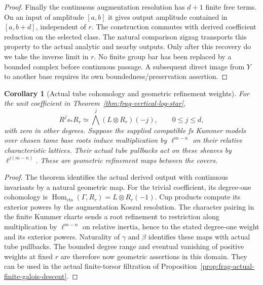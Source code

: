 \documentclass[11pt]{article}
\newtheorem{corollary}[theorem]{Corollary}
\theoremstyle{definition}
\theoremstyle{remark}
\begin{document}
\begin{proof}
Finally the continuous augmentation resolution has $d+1$ finite free
terms.  On an input of amplitude $[a,b]$ it gives output amplitude
contained in $[a,b+d]$, independent of $r$.  The construction commutes
with derived coefficient reduction on the selected class.  The natural
comparison zigzag transports this property to the actual analytic and
nearby outputs.  Only after this recovery do we take the inverse limit
in $r$.  No finite group bar has been replaced by a bounded complex
before continuous passage.  A subsequent direct image from $Y$ to another
base requires its own boundedness/preservation assertion.
\end{proof}

\begin{corollary}[Actual tube cohomology and geometric refinement weights]
\label{cor:frag-log-tube-root-weights}
For the unit coefficient in Theorem~\ref{thm:frag-vertical-log-star},
\[
 R^j s_*R_r\simeq\bigwedge^j(L\otimes R_r)(-j),\qquad 0\le j\le d,
\]
with zero in other degrees.  Suppose the supplied compatible fs Kummer
models over chosen tame base roots induce multiplication by
$\ell^{m-n}$ on their relative characteristic lattices.  Their actual
tube pullbacks act on these sheaves by $\ell^{j(m-n)}$.  These are
geometric refinement maps between the covers.
\end{corollary}

\begin{proof}
The theorem identifies the actual derived output with continuous
invariants by a natural geometric map.  For the trivial coefficient,
its degree-one cohomology is
$\operatorname{Hom}_{\mathrm{cts}}(\Gamma,R_r)=L\otimes R_r(-1)$.
Cup products compute its exterior powers by the augmentation Koszul
resolution.  The character pairing in the finite Kummer charts sends
a root refinement to restriction along multiplication by
$\ell^{m-n}$ on relative inertia, hence to the stated degree-one
weight and its exterior powers.  Naturality of $\gamma$ and $\beta$
identifies these maps with actual tube pullbacks.  The bounded degree
range and eventual vanishing of positive weights at fixed $r$ are
therefore now geometric assertions in this domain.  They can be used
in the actual finite-torsor filtration of Proposition~\ref{prop:frag-actual-finite-galois-descent}.
\end{proof}
\end{document}
